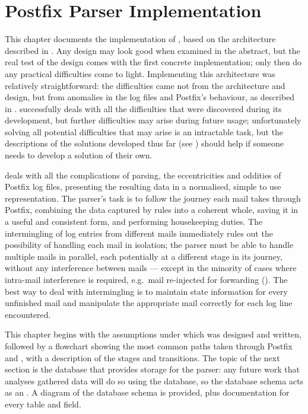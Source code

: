 \chapter{Postfix Parser Implementation}

\label{Postfix Parser Implementation}

This chapter documents the implementation of \parsername{}, based on the
architecture described in .  Any design may
look good when examined in the abstract, but the real test of the design
comes with the first concrete implementation; only then do any practical
difficulties come to light.  Implementing this architecture was relatively
straightforward: the difficulties came not from the architecture and
design, but from anomalies in the log files and Postfix's behaviour, as
described in .  \parsername{} successfully deals
with all the difficulties that were discovered during its development, but
further difficulties may arise during future usage; unfortunately solving
all potential difficulties that may arise is an intractable task, but the
descriptions of the solutions developed thus far (see
) should help if someone needs to develop a
solution of their own.

\parsername{} deals with all the complications of parsing, the
eccentricities and oddities of Postfix log files, presenting the resulting
data in a normalised, simple to use representation.  The parser's task is
to follow the journey each mail takes through Postfix, combining the data
captured by rules into a coherent whole, saving it in a useful and
consistent form, and performing housekeeping duties.  The intermingling of
log entries from different mails immediately rules out the possibility of
handling each mail in isolation; the parser must be able to handle multiple
mails in parallel, each potentially at a different stage in its journey,
without any interference between mails --- except in the minority of cases
where intra-mail interference is required, e.g.\ mail re-injected for
forwarding ().  The best way to deal with
intermingling is to maintain state information for every unfinished mail
and manipulate the appropriate mail correctly for each log line
encountered.

This chapter begins with the assumptions under which \parsername{} was
designed and written, followed by a flowchart showing the most common paths
taken through Postfix and \parsername{}, with a description of the stages
and transitions.  The topic of the next section is the database that
provides storage for the parser: any future work that analyses gathered
data will do so using the database, so the database schema acts as an
.  A diagram of the database schema is provided, plus
documentation for every table and field.

